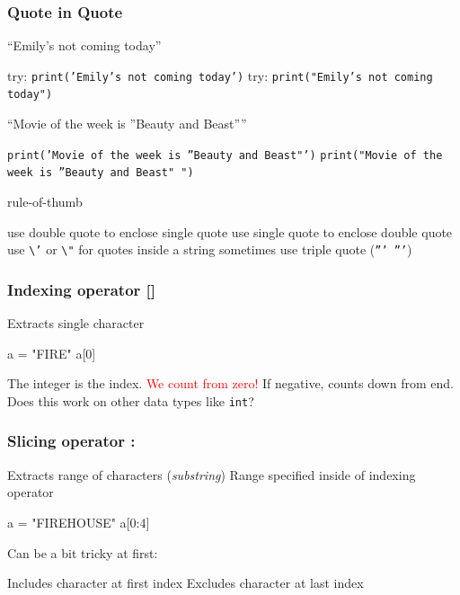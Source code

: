 \documentclass[11pt]{beamer}
\begin{document}
\begin{frame}
  \frametitle{Quote in Quote}
  \Enlarge

  \begin{itemize}
  \myitem  ``Emily's not coming today''
  	\begin{itemize}
	\mysubitem try: \texttt{{\small print('Emily's not coming today')}}
	\mysubitem try: \texttt{{\small print("Emily's not coming today")}}
	\end{itemize}\pause
  \myitem ``Movie of the week is ''Beauty and Beast''''
  	\begin{itemize}
	\mysubitem \texttt{{\small print('Movie of the week is ''Beauty and Beast"')}}
	\mysubitem \texttt{{\small print("Movie of the week is ''Beauty and Beast" ")}}
	\end{itemize} \pause
  \myitem rule-of-thumb 
  	\begin{itemize}
	\mysubitem use double quote to enclose single quote
	\mysubitem use single quote to enclose double quote \pause
	\mysubitem use \texttt{\textbackslash '} or \texttt{\textbackslash "} for quotes inside a string \pause
	\mysubitem sometimes use triple quote (\texttt{''' '''})
	\end{itemize}
 \end{itemize}
\end{frame}


\begin{frame}[fragile]
  \frametitle{Indexing operator \textbf{[]}}
  \Enlarge

  \begin{itemize}
  \myitem  Extracts single character
\begin{semiverbatim}
a = "FIRE"
a[0]
\end{semiverbatim}
  \myitem  The integer is the index. \pause
  \myitem  \textcolor{red}{We count from zero!} \pause
  \myitem  If negative, counts down from end. \pause
  \myitem  Does this work on other data types like \texttt{int}?
  \end{itemize}
\end{frame}

\begin{frame}[fragile]
  \frametitle{Slicing operator \textbf{:}}
  \Enlarge

  \begin{itemize}
  \myitem  Extracts range of characters (\emph{substring}) \pause
  \myitem  Range specified inside of indexing operator \pause
\begin{semiverbatim}
a = "FIREHOUSE"
a[0:4]
\end{semiverbatim} \pause
  \myitem  Can be a bit tricky at first:
    \begin{itemize}
    \mysubitem  Includes character at first index
    \mysubitem  Excludes character at last index
    \end{itemize}
  \end{itemize}
\end{frame}
\end{document}
